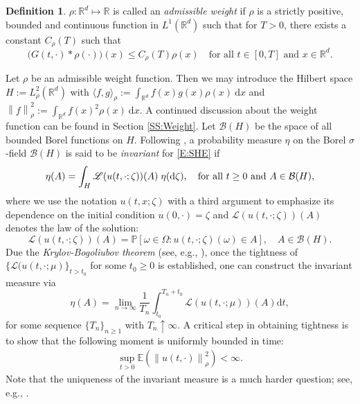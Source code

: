 \documentclass[12pt]{report}
\theoremstyle{plain}
\theoremstyle{definition}
\newtheorem{definition}[theorem]{Definition}
\numberwithin{equation}{section}
\newcommand{\R}{\mathbb{R}}
\newcommand{\E}{\mathbb{E}}
\newcommand{\Norm}[1]{\left\|  #1   \right\|}
\newcommand{\ud}{\ensuremath{ \mathrm{d} }}
\begin{document}
\begin{definition} \label{D:Rho}
	$\rho:\R^d\mapsto \R$ is called an \textit{admissible weight} if $\rho$ is a strictly positive,
	bounded and continuous function in $L^1(\R^d)$ such that for $T>0$, there exists a constant
	$C_\rho(T)$ such that
	\begin{equation} \label{E:aw}
	\big(G(t,\cdot)*\rho(\cdot)\big)(x) \le C_\rho(T) \rho(x)
	\quad \text{for all $t\in[0,T]$ and $x\in\R^d$.}
	\end{equation}
\end{definition}

Let $\rho$ be an admissible weight function. Then we may introduce the Hilbert space
$H:=L_\rho^2(\R^d)$ with $\langle f,g \rangle_\rho := \int_{\R^d}f(x)g(x)\rho(x) \: \ud x$ and
$\Norm{f}_\rho^2 :=\int_{\R^d}f(x)^2\rho(x) \: \ud x$. A continued discussion about the weight function
can be found in Section \ref{SS:Weight}. Let $\mathcal{B}(H)$ be the space of all bounded Borel
functions on $H$. Following  \cite{da-prato.zabczyk:14:stochastic}, a probability measure $\eta$
on the Borel $\sigma$-field $\mathcal{B}(H)$ is said to be {\it invariant} for \eqref{E:SHE} if
\begin{equation}\label{E:InvMeas}
\eta(A) = \int_{H} \mathscr{L}(u(t,\cdot;\zeta))(A) \; \eta(\ud \zeta),
\quad \text{for all $ t\ge 0$ and $A\in \mathcal{B}(H)$},
\end{equation}
where we use the notation $u(t,x;\zeta)$ with a third argument to emphasize its dependence on the
initial condition $u(0,\cdot)=\zeta$ and $\mathscr{L}(u(t,\cdot;\zeta))(A)$ denotes the law of the solution:
\[
\mathscr{L}(u(t,\cdot;\zeta))(A) = \mathbb{P} \left[ \omega \in \Omega: u(t,\cdot; \zeta)(\omega) \in A \right], \quad A\in \mathcal{B}(H).
\]
Due the {\it Krylov-Bogoliubov theorem} (see, e.g.,
\cite[Theorem 11.7]{da-prato.zabczyk:14:stochastic}), once the tightness of
$\{\mathcal{L}(u(t,\cdot;\mu)\}_{t>t_0}$ for some $ t_0\ge 0$ is established, one can construct the
invariant measure via
\begin{equation} \label{E:InvMeasForm}
\eta(A) = \lim_{n \to \infty} \frac{1}{T_n} \int_{t_0}^{T_n + t_0} \mathscr{L}(u(t,\cdot; \mu))(A) \ud t,
\end{equation}
for some sequence $\{T_n\}_{n\ge 1}$ with $T_n\uparrow \infty$. A critical step in obtaining
tightness is to show that the following moment is uniformly bounded in time:
\begin{align} \label{E:BddMnt}
\sup_{t>0} \E\left(\Norm{u(t,\cdot)}_{\rho}^2\right)
<\infty.
\end{align}
Note that the uniqueness of the invariant measure is a much harder question; see, e.g.,
\cite{hairer.mattingly:06:ergodicity}.
\end{document}
